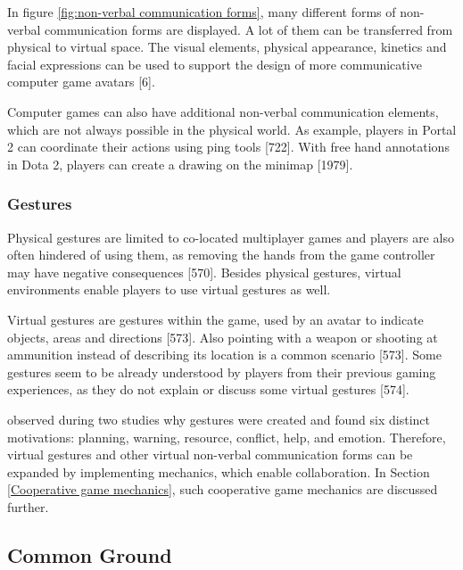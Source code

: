In figure \ref{fig:non-verbal communication forms}, many different forms of non-verbal communication forms are displayed. A lot of them can be transferred from physical to virtual space. The visual elements, physical appearance, kinetics and facial expressions can be used to support the design of more communicative computer game avatars \autocite{Kujanpaa2003SupportingAvatars}[6].

Computer games can also have additional non-verbal communication elements, which are not always possible in the physical world. As example, players in Portal 2 can coordinate their actions using ping tools \autocite{Vaddi2015Validating2}[722]. With free hand annotations in Dota 2, players can create a drawing on the minimap \autocite{Wuertz2017Why2}[1979].


\subsubsection{Gestures}

Physical gestures are limited to co-located multiplayer games and players are also often hindered of using them, as removing the hands from the game controller may have negative consequences \autocite{Cheung2012CommunicationGaming}[570]. Besides physical gestures, virtual environments enable players to use virtual gestures as well.

Virtual gestures are gestures within the game, used by an avatar to indicate objects, areas and directions \autocite{Cheung2012CommunicationGaming}[573].
Also pointing with a weapon or shooting at ammunition instead of describing its location is a common scenario \autocite{Cheung2012CommunicationGaming}[573]. Some gestures seem to be already understood by players from their previous gaming experiences, as they do not explain or discuss some virtual gestures \autocite{Cheung2012CommunicationGaming}[574].

\textcite{Wuertz2017Why2} observed during two studies why gestures were created and found six distinct motivations: planning, warning, resource, conflict, help, and emotion.
Therefore, virtual gestures and other virtual non-verbal communication forms can be expanded by implementing mechanics, which enable collaboration. In Section \ref{Cooperative game mechanics}, such cooperative game mechanics are discussed further.

\subsection{Common Ground}
\label{section:Common Ground}

